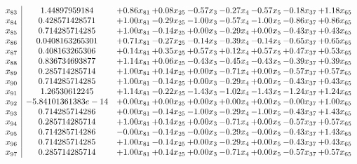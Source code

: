 \documentclass[8pt]{article}
\begin{document}
\[\begin{array}{c| c c@{\hskip 2pt} c@{\hskip 2pt} c@{\hskip 2pt} c@{\hskip 2pt} c@{\hskip 2pt} c@{\hskip 2pt} c@{\hskip 2pt} }
 x_{83}   &  1.44897959184 & +  0.86 x_{81} & +  0.08 x_{25} & -0.57 x_{3} & -0.27 x_{4} & -0.57 x_{5} & -0.18 x_{37} & +  1.18 x_{65}\\
 x_{84}   &  0.428571428571 & +  1.00 x_{81} & -0.29 x_{25} & -1.00 x_{3} & -0.57 x_{4} & -1.00 x_{5} & -0.86 x_{37} & +  0.86 x_{65}\\
 x_{85}   &  0.714285714285 & +  1.00 x_{81} & -0.14 x_{25} & +  0.00 x_{3} & -0.29 x_{4} & +  0.00 x_{5} & -0.43 x_{37} & +  0.43 x_{65}\\
 x_{86}   &  0.0408163265301 & +  0.71 x_{81} & -0.27 x_{25} & -0.14 x_{3} & -0.39 x_{4} & -0.14 x_{5} & -0.65 x_{37} & +  0.65 x_{65}\\
 x_{87}   &  0.408163265306 & +  0.14 x_{81} & +  0.35 x_{25} & +  0.57 x_{3} & +  0.12 x_{4} & +  0.57 x_{5} & +  0.47 x_{37} & +  0.53 x_{65}\\
 x_{88}   &  0.836734693877 & +  1.14 x_{81} & +  0.06 x_{25} & -0.43 x_{3} & -0.45 x_{4} & -0.43 x_{5} & -0.39 x_{37} & +  0.39 x_{65}\\
 x_{89}   &  0.285714285714 & +  1.00 x_{81} & +  0.14 x_{25} & +  0.00 x_{3} & -0.71 x_{4} & +  0.00 x_{5} & -0.57 x_{37} & +  0.57 x_{65}\\
 x_{90}   &  0.714285714285 & +  1.00 x_{81} & -0.14 x_{25} & +  0.00 x_{3} & -0.29 x_{4} & +  0.00 x_{5} & -0.43 x_{37} & +  0.43 x_{65}\\
 x_{91}   &  1.26530612245 & +  1.14 x_{81} & -0.22 x_{25} & -1.43 x_{3} & -1.02 x_{4} & -1.43 x_{5} & -1.24 x_{37} & +  1.24 x_{65}\\
 x_{92}   &  -5.84101361383e-14 & +  0.00 x_{81} & +  0.00 x_{25} & +  0.00 x_{3} & +  0.00 x_{4} & +  0.00 x_{5} & -0.00 x_{37} & +  1.00 x_{65}\\
 x_{93}   &  0.714285714286 & +  0.00 x_{81} & -0.14 x_{25} & -1.00 x_{3} & -0.29 x_{4} & -1.00 x_{5} & -0.43 x_{37} & +  1.43 x_{65}\\
 x_{94}   &  0.285714285714 & +  1.00 x_{81} & +  0.14 x_{25} & +  0.00 x_{3} & -0.71 x_{4} & +  0.00 x_{5} & -0.57 x_{37} & +  0.57 x_{65}\\
 x_{95}   &  0.714285714286 & -0.00 x_{81} & -0.14 x_{25} & -0.00 x_{3} & -0.29 x_{4} & -0.00 x_{5} & -0.43 x_{37} & +  1.43 x_{65}\\
 x_{96}   &  0.714285714285 & +  1.00 x_{81} & -0.14 x_{25} & +  0.00 x_{3} & -0.29 x_{4} & +  0.00 x_{5} & -0.43 x_{37} & +  0.43 x_{65}\\
 x_{97}   &  0.285714285714 & +  1.00 x_{81} & +  0.14 x_{25} & +  0.00 x_{3} & -0.71 x_{4} & +  0.00 x_{5} & -0.57 x_{37} & +  0.57 x_{65}\\

\end{array}\]
\end{document}
